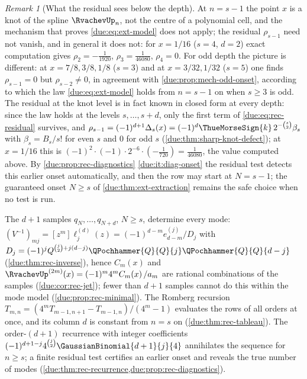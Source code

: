 \documentclass[11pt,oneside]{article}
\theoremstyle{plain}
\theoremstyle{definition}
\theoremstyle{remark}
\newtheorem{remark}[theorem]{Remark}
\newcommand{\upn}[1]{\RvachevUp_{#1}}
\newcommand{\Qq}{Q}                                         %
\newcommand{\am}[1]{a_{#1}}                                 %
\newcommand{\Cr}[2]{C_{#1}\!\left(#2\right)}                %
\newcommand{\qn}[1]{q_{#1}}                                 %
\begin{document}
\begin{remark}[What the residual sees below the depth]
\label{due:rmk:rec-below-onset}
At $n=s-1$ the point $x$ is a knot of the spline $\upn{n}$, not the centre of
a polynomial cell, and the mechanism that proves \cref{due:eq:ext-model}
does not apply; the residual $\rho_{s-1}$ need not vanish, and in general it
does not: for $x=1/16$ ($s=4$, $d=2$) exact computation gives
$\rho_{2}=-\tfrac{1}{1920}$, $\rho_{3}=\tfrac{1}{46080}$, $\rho_{4}=0$.  For
odd depth the picture is different: at $x=7/8,3/8,1/8$ ($s=3$) and at
$x=3/32,1/32$ ($s=5$) one finds $\rho_{s-1}=0$ but $\rho_{s-2}\neq0$, in
agreement with \cref{due:prop:mech-odd-onset}, according to which the law
\cref{due:eq:ext-model} holds from $n=s-1$ on when $s\ge3$ is odd.  The
residual at the knot level is in fact known in closed form at every depth:
since the law holds at the levels $s,\ldots,s+d$, only the first term of
\cref{due:eq:rec-residual} survives, and
$\rho_{s-1}=(-1)^{d+1}\Delta_{s}(x)=(-1)^{d}\ThueMorseSign{k}\,2^{-\binom s2}\beta_{s}$
with $\beta_{s}=B_{s}/s!$ for even $s$ and $0$ for odd $s$
(\cref{due:thm:sharp-knot-defect}); at $x=1/16$ this is
$(-1)^{2}\cdot(-1)\cdot2^{-6}\cdot(-\tfrac1{720})=\tfrac1{46080}$, the value
computed above.  By \cref{due:prop:rec-diagnostics}%
\ref{due:it:diag-onset} the residual test detects this earlier onset
automatically, and then the row may start at $N=s-1$; the guaranteed onset
$N\ge s$ of \cref{due:thm:ext-extraction} remains the safe choice when no
test is run.
\end{remark}

\begin{summarybox}[title={Section summary}]
The $d+1$ samples $\qn{N},\ldots,\qn{N+d}$, $N\ge s$, determine every mode:
$(V^{-1})_{mj}=[z^{m}]\ell^{(d)}_{j}(z)=(-1)^{d-m}e^{(j)}_{d-m}/D_{j}$ with
$D_{j}=(-1)^{j}\Qq^{\binom j2+j(d-j)}\QPochhammer{\Qq}{\Qq}{j}
\QPochhammer{\Qq}{\Qq}{d-j}$ (\cref{due:thm:rec-inverse}), hence
$\Cr{m}{x}$ and $\RvachevUp^{(2m)}(x)=(-1)^{m}4^{m}\Cr{m}{x}/\am{m}$ are
rational combinations of the samples (\cref{due:cor:rec-jet}); fewer than
$d+1$ samples cannot do this within the mode model
(\cref{due:prop:rec-minimal}).  The Romberg recursion
$T_{m,n}=(4^{m}T_{m-1,n+1}-T_{m-1,n})/(4^{m}-1)$ evaluates the rows of all
orders at once, and its column $d$ is constant from $n=s$ on
(\cref{due:thm:rec-tableau}).  The order-$(d+1)$ recurrence with integer
coefficients $(-1)^{d+1-j}4^{\binom j2}\GaussianBinomial{d+1}{j}{4}$
annihilates the sequence for $n\ge s$; a finite residual test certifies an
earlier onset and reveals the true number of modes
(\cref{due:thm:rec-recurrence,due:prop:rec-diagnostics}).
\end{summarybox}
\end{document}

